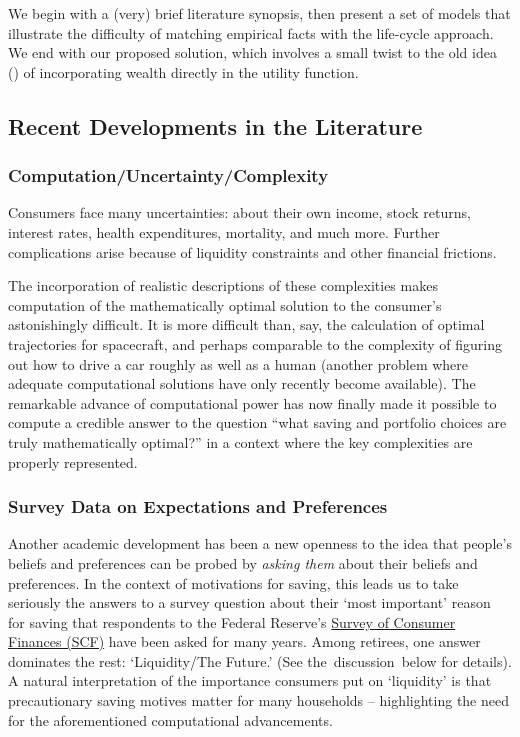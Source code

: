\documentclass{article}
\begin{document}
We begin with a (very) brief literature synopsis, then present a set of models that illustrate the difficulty of matching empirical facts with the life-cycle approach.
We end with our proposed solution, which involves a small twist to the old idea (\cite{carrollWhyDoTheRich}) of incorporating wealth directly in the utility function.

\subsection{Recent Developments in the Literature}

\subsubsection{Computation/Uncertainty/Complexity}

Consumers face many uncertainties: about their own income, stock returns, interest rates, health expenditures, mortality, and much more.
Further complications arise because of liquidity constraints and other financial frictions.

The incorporation of realistic descriptions of these complexities makes computation of the mathematically optimal solution to the consumer's astonishingly difficult.
It is more difficult than, say, the calculation of optimal trajectories for spacecraft, and perhaps comparable to the complexity of figuring out how to drive a car roughly as well as a human (another problem where adequate computational solutions have only recently become available).
The remarkable advance of computational power has now finally made it possible to compute a credible answer to the question ``what saving and portfolio choices are truly mathematically optimal?'' in a context where the key complexities are properly represented.

\subsubsection{Survey Data on Expectations and Preferences}

Another academic development has been a new openness to the idea that people's beliefs and preferences can be probed by \textit{asking them} about their beliefs and preferences.
In the context of motivations for saving, this leads us to take seriously the answers to a survey question about their `most important' reason for saving that respondents to the Federal Reserve's \href{https://www.federalreserve.gov/econres/scfindex.htm}{Survey of Consumer Finances (SCF)} have been asked for many years.
Among retirees, one answer dominates the rest: `Liquidity/The Future.'  (See the~discussion~below for details).
A natural interpretation of the importance consumers put on `liquidity' is that precautionary saving motives matter for many households -- highlighting the need for the aforementioned computational advancements.
\end{document}
